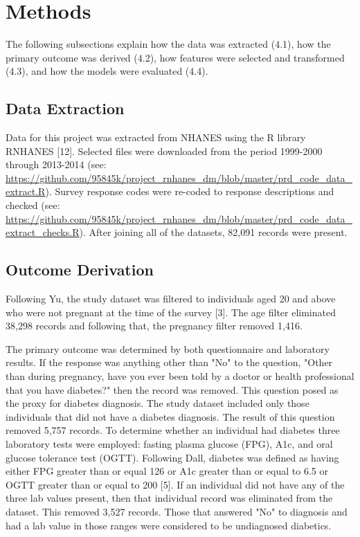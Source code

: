 \documentclass[twoside,11pt]{article}
\begin{document}
\section{Methods} \label{methods}
The following subsections explain how the data was extracted (4.1), how the primary outcome was derived (4.2), how features were selected and transformed (4.3), and how the models were evaluated (4.4). 

\subsection{Data Extraction} 
Data for this project was extracted from NHANES using the R library RNHANES [12]. Selected files were downloaded from the period 1999-2000 through 2013-2014 (see: \url{https://github.com/95845k/project_rnhanes_dm/blob/master/prd_code_data_extract.R}). Survey response codes were re-coded to response descriptions and checked (see: \url{https://github.com/95845k/project_rnhanes_dm/blob/master/prd_code_data_extract_checks.R}). After joining all of the datasets, 82,091 records were present. 

\subsection{Outcome Derivation} 
Following Yu, the study dataset was filtered to individuals aged 20 and above who were not pregnant at the time of the survey [3]. The age filter eliminated 38,298 records and following that, the pregnancy filter removed 1,416. 

The primary outcome was determined by both questionnaire and laboratory results. If the response was anything other than "No" to the question, "Other than during pregnancy, have you ever been told by a doctor or health professional that you have diabetes?" then the record was removed. This question posed as the proxy for diabetes diagnosis. The study dataset included only those individuals that did not have a diabetes diagnosis. The result of this question removed 5,757 records. To determine whether an individual had diabetes three laboratory tests were employed: fasting plasma glucose (FPG), A1c, and oral glucose tolerance test (OGTT). Following Dall, diabetes was defined as having either FPG greater than or equal 126 or A1c greater than or equal to 6.5 or OGTT greater than or equal to 200 [5]. If an individual did not have any of the three lab values present, then that individual record was eliminated from the dataset. This removed 3,527 records. Those that answered "No" to diagnosis and had a lab value in those ranges were considered to be undiagnosed diabetics. 
\end{document}
